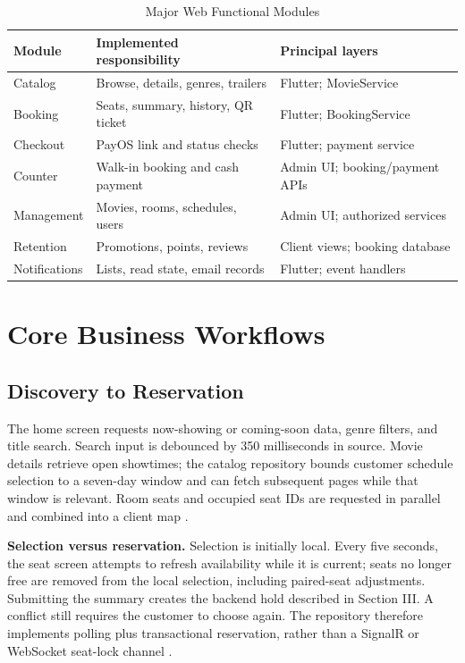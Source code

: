\documentclass[conference]{IEEEtran}
\begin{document}
\begin{table}[t]
\caption{Major Web Functional Modules}\label{tab:modules}
\centering\footnotesize
\begin{tabularx}{\columnwidth}{@{}lYY@{}}\toprule
\textbf{Module} & \textbf{Implemented responsibility} & \textbf{Principal layers}\\\midrule
Catalog & Browse, details, genres, trailers & Flutter; MovieService\\
Booking & Seats, summary, history, QR ticket & Flutter; BookingService\\
Checkout & PayOS link and status checks & Flutter; payment service\\
Counter & Walk-in booking and cash payment & Admin UI; booking/payment APIs\\
Management & Movies, rooms, schedules, users & Admin UI; authorized services\\
Retention & Promotions, points, reviews & Client views; booking database\\
Notifications & Lists, read state, email records & Flutter; event handlers\\\bottomrule
\end{tabularx}
\end{table}

\section{Core Business Workflows}
\subsection{Discovery to Reservation}
The home screen requests now-showing or coming-soon data, genre filters, and
title search. Search input is debounced by 350 milliseconds in source.
Movie details retrieve open showtimes; the catalog repository bounds customer
schedule selection to a seven-day window and can fetch subsequent pages while
that window is relevant. Room seats and occupied seat IDs are requested in
parallel and combined into a client map \cite{client,webui}.

\textbf{Selection versus reservation.} Selection is initially local. Every five seconds, the seat screen attempts to
refresh availability while it is current; seats no longer free are removed
from the local selection, including paired-seat adjustments. Submitting the
summary creates the backend hold described in Section III. A conflict still
requires the customer to choose again. The repository therefore implements
polling plus transactional reservation, rather than a SignalR or WebSocket
seat-lock channel \cite{client,booking}.
\end{document}
